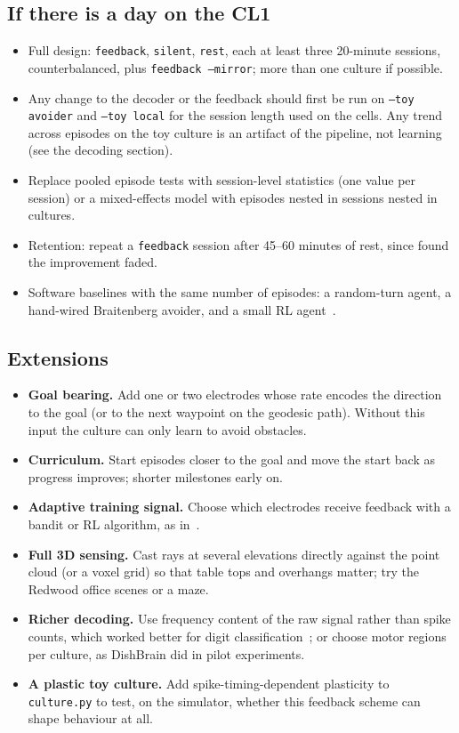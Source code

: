 \documentclass[11pt,a4paper]{article}
\newcommand{\code}[1]{\texttt{#1}}
\newcommand{\todo}{\item[$\square$]}
\begin{document}
\subsection*{If there is a day on the CL1}
\begin{itemize}[leftmargin=2em]
  \todo Full design: \code{feedback}, \code{silent}, \code{rest}, each at least three 20-minute
        sessions, counterbalanced, plus \code{feedback --mirror}; more than one culture if possible.
  \todo Any change to the decoder or the feedback should first be run on \code{--toy avoider}
        and \code{--toy local} for the session length used on the cells. Any trend across
        episodes on the toy culture is an artifact of the pipeline, not learning (see the
        decoding section).
  \todo Replace pooled episode tests with session-level statistics (one value per session) or a
        mixed-effects model with episodes nested in sessions nested in cultures.
  \todo Retention: repeat a \code{feedback} session after 45--60 minutes of rest, since
        \citet{robbins2026organoids} found the improvement faded.
  \todo Software baselines with the same number of episodes: a random-turn agent, a hand-wired
        Braitenberg avoider, and a small RL agent~\citep{khajehnejad2024sample}.
\end{itemize}

\subsection*{Extensions}
\begin{itemize}[leftmargin=2em]
  \todo \textbf{Goal bearing.} Add one or two electrodes whose rate encodes the direction to the
        goal (or to the next waypoint on the geodesic path). Without this input the culture can
        only learn to avoid obstacles.
  \todo \textbf{Curriculum.} Start episodes closer to the goal and move the start back as progress
        improves; shorter milestones early on.
  \todo \textbf{Adaptive training signal.} Choose which electrodes receive feedback with a
        bandit or RL algorithm, as in~\citet{robbins2026organoids}.
  \todo \textbf{Full 3D sensing.} Cast rays at several elevations directly against the point cloud
        (or a voxel grid) so that table tops and overhangs matter; try the Redwood office scenes or
        a maze.
  \todo \textbf{Richer decoding.} Use frequency content of the raw signal rather than spike counts,
        which worked better for digit classification~\citep{loeffler2026digits}; or choose motor
        regions per culture, as DishBrain did in pilot experiments.
  \todo \textbf{A plastic toy culture.} Add spike-timing-dependent plasticity to \code{culture.py}
        to test, on the simulator, whether this feedback scheme can shape behaviour at all.
\end{itemize}
\end{document}
